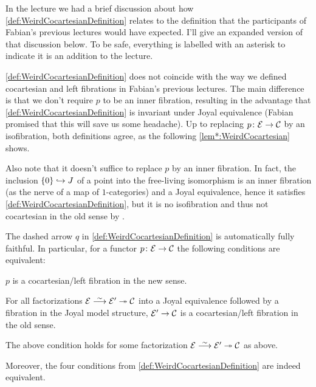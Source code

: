 In the lecture we had a brief discussion about how \cref{def:WeirdCocartesianDefinition} relates to the definition that the participants of Fabian's previous lectures would have expected. I'll give an expanded version of that discussion below. To be safe, everything is labelled with an asterisk to indicate it is an addition to the lecture.
\begin{warn*}
	\cref{def:WeirdCocartesianDefinition} does not coincide with the way we defined cocartesian and left fibrations in Fabian's previous lectures. The main difference is that we don't require $p$ to be an inner fibration, resulting in the advantage that \cref{def:WeirdCocartesianDefinition} is invariant under Joyal equivalence (Fabian promised that this will save us some headache). Up to replacing $p\colon \Ee\morphism\Cc$ by an isofibration, both definitions agree, as the following \cref{lem*:WeirdCocartesian} shows.
	
	Also note that it doesn't suffice to replace $p$ by an inner fibration. In fact, the inclusion $\{0\}\monomorphism J$ of a point into the free-living isomorphism is an inner fibration (as the nerve of a map of $1$-categories) and a Joyal equivalence, hence it satisfies \cref{def:WeirdCocartesianDefinition}, but it is no isofibration and thus not cocartesian in the old sense by \cite[Proposition~IX.2]{HigherCatsII}.
\end{warn*}
\begin{lem*}\label{lem*:WeirdCocartesian}
	The dashed arrow $q$ in \cref{def:WeirdCocartesianDefinition} is automatically fully faithful. In particular, for a functor $p\colon \Ee\morphism\Cc$ the following conditions are equivalent:
	\begin{alphanumerate}
		\item $p$ is a cocartesian/left fibration in the new sense.
		\item For all factorizations $\Ee\isomorphism\Ee'\epimorphism\Cc$ into a Joyal equivalence followed by a fibration in the Joyal model structure, $\Ee'\morphism\Cc$ is a cocartesian/left fibration in the old sense.
		\item The above condition holds for some factorization $\Ee\isomorphism\Ee'\epimorphism\Cc$ as above.
	\end{alphanumerate}
	Moreover, the four conditions from \cref{def:WeirdCocartesianDefinition} are indeed equivalent.
\end{lem*}
